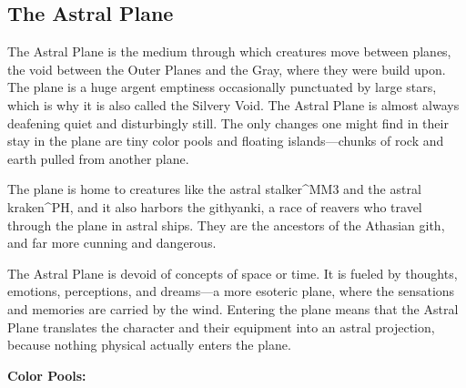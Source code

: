 \subsection{The Astral Plane}
The Astral Plane is the medium through which creatures move between planes, the void between the Outer Planes and the Gray, where they were build upon. The plane is a huge argent emptiness occasionally punctuated by large stars, which is why it is also called the Silvery Void. The Astral Plane is almost always deafening quiet and disturbingly still. The only changes one might find in their stay in the plane are tiny color pools and floating islands---chunks of rock and earth pulled from another plane.

The plane is home to creatures like the astral stalker^{MM3} and the astral kraken^{PH}, and it also harbors the githyanki, a race of reavers who travel through the plane in astral ships. They are the ancestors of the Athasian gith, and far more cunning and dangerous.

The Astral Plane is devoid of concepts of space or time. It is fueled by thoughts, emotions, perceptions, and dreams---a more esoteric plane, where the sensations and memories are carried by the wind. Entering the plane means that the Astral Plane translates the character and their equipment into an astral projection, because nothing physical actually enters the plane.

\textbf{Color Pools:} 


